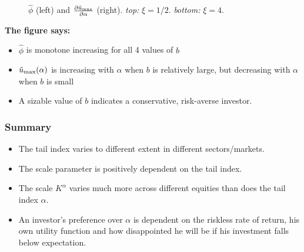 \documentclass{beamer}
\begin{document}
\begin{frame}
\begin{minipage}[t]{0.5\linewidth}
\begin{figure}[htb!]
\begin{minipage}{0.5\linewidth}
      \end{minipage}
      \caption{$\hat\phi$ (left) and
        ${\partial \tilde u_{\rm max} \over \partial \alpha}$ (right).
        {\em top:} $\xi = 1/2$. {\em bottom:} $\xi = 4$.
      }
      \label{fig:htfg}
    \end{figure}
  \end{minipage}\hfill
  \begin{minipage}[t]{0.5\linewidth}
    \textcolor[HTML]{990033}{\bf The figure says:}
    \begin{itemize}
    \item  $\hat\phi$ is monotone increasing for all 4 values of $b$
    \item $\tilde u_{\rm max}(\alpha)$ is increasing with $\alpha$
      when $b$ is relatively large, but  decreasing with $\alpha$ when
      $b$ is small
    \item A sizable value of $b$ indicates a conservative, risk-averse investor.
    \end{itemize}
  \end{minipage}
\end{frame}

\begin{frame}
  \frametitle{Summary}
  \begin{itemize}
  \item The tail index varies to different extent in different
    sectors/markets.
  \item The scale parameter is positively dependent on the tail index.
  \item The scale $K^{\alpha}$ varies much more across different
    equities than does the tail index $\alpha$.
  \item An investor's preference over $\alpha$ is dependent on the
    riskless rate of return, his own utility function and how
    disappointed he will be if his investment falls below
    expectation.
  \end{itemize}
\end{frame}

\end{document}
